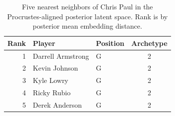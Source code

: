 \begin{table}[htbp]
  \centering\small
  \begin{tabular}{rllc}
    \toprule
    Rank & Player & Position & Archetype \\
    \midrule
    1 & Darrell Armstrong & G & 2 \\
    2 & Kevin Johnson & G & 2 \\
    3 & Kyle Lowry & G & 2 \\
    4 & Ricky Rubio & G & 2 \\
    5 & Derek Anderson & G & 2 \\
    \bottomrule
  \end{tabular}
  \caption{Five nearest neighbors of Chris Paul in the Procrustes-aligned posterior latent space. Rank is by posterior mean embedding distance.}
  \label{tab:Chris_Paul_neighbors}
\end{table}

